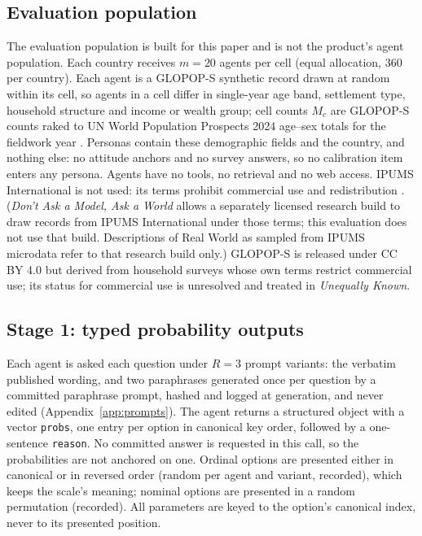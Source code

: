 \documentclass[11pt]{article}
\begin{document}
\subsection{Evaluation population}
\label{sec:evalpop}
The evaluation population is built for this paper and is not the product's agent population. Each country receives $m=20$ agents per cell (equal allocation, 360 per country). Each agent is a GLOPOP-S synthetic record \citep{ton2024glopop} drawn at random within its cell, so agents in a cell differ in single-year age band, settlement type, household structure and income or wealth group; cell counts $M_c$ are GLOPOP-S counts raked to UN World Population Prospects 2024 age--sex totals for the fieldwork year \citep{wpp2024,deming1940ipf}. Personas contain these demographic fields and the country, and nothing else: no attitude anchors and no survey answers, so no calibration item enters any persona. Agents have no tools, no retrieval and no web access. IPUMS International is not used: its terms prohibit commercial use and redistribution \citep{ipums2026terms}. (\emph{Don't Ask a Model, Ask a World} allows a separately licensed research build to draw records from IPUMS International under those terms; this evaluation does not use that build. Descriptions of Real World as sampled from IPUMS microdata refer to that research build only.) GLOPOP-S is released under CC BY 4.0 but derived from household surveys whose own terms restrict commercial use; its status for commercial use is unresolved and treated in \emph{Unequally Known}.

\subsection{Stage 1: typed probability outputs}
Each agent is asked each question under $R=3$ prompt variants: the verbatim published wording, and two paraphrases generated once per question by a committed paraphrase prompt, hashed and logged at generation, and never edited (Appendix~\ref{app:prompts}). The agent returns a structured object with a vector \texttt{probs}, one entry per option in canonical key order, followed by a one-sentence \texttt{reason}. No committed answer is requested in this call, so the probabilities are not anchored on one. Ordinal options are presented either in canonical or in reversed order (random per agent and variant, recorded), which keeps the scale's meaning; nominal options are presented in a random permutation (recorded). All parameters are keyed to the option's canonical index, never to its presented position.
\end{document}
